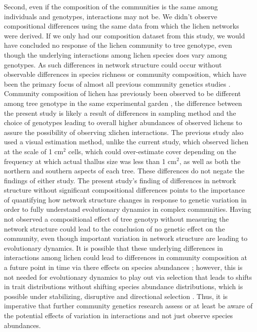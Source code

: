 \documentclass[fleqn,12pt]{olplainarticle}
\begin{document}
Second, even if the composition of the communities is the same among
individuals and genotypes, interactions may not be. We didn't observe
compositional differences using the same data from which the lichen
networks were derived. If we only had our composition dataset from
this study, we would have concluded no response of the lichen
community to tree genotype, even though the underlying interactions
among lichen species does vary among genotypes. As such differences in
network structure could occur without observable differences in
species richness or community composition, which have been the primary
focus of almost all previous community genetics studies
\cite{DesRoches2018TheVariation}. Community composition of lichen has
previously been observed to be different among tree genotype in the
same experimental garden \cite{Lamit2011, Lamit2015a}, the difference
between the present study is likely a result of differences in
sampling method and the choice of genotypes leading to overall higher
abundances of observed lichens to assure the possibility of observing
xlichen interactions. The previous study also used a visual estimation
method, unlike the current study, which observed lichen at the scale
of 1 cm$^2$ cells, which could over-estimate cover depending on the
frequency at which actual thallus size was less than 1 cm$^2$, as well
as both the northern and southern aspects of each tree. These
differences do not negate the findings of either study. The present
study's finding of differences in network structure without
significant compositional differences points to the importance of
quantifying how network structure changes in response to genetic
variation in order to fully understand evolutionary dynamics in
complex communities. Having not observed a compositional effect of
tree genotyp without measuring the network structure could lead to the
conclusion of no genetic effect on the community, even though
important variation in network structure are leading to evolutionary
dynamics. It is possible that these underlying differences in
interactions among lichen could lead to differences in community
composition at a future point in time via there effects on species
abundances \cite{Shuster2006COMMUNITYSTRUCTURE}; however, this is not
needed for evolutionary dynamics to play out via selection that leads
to shifts in trait distributions without shifting species abundance
distributions, which is possible under stabilizing, disruptive and
directional selection \cite{Conner2004ATextbook}. Thus, it is
imperative that further community genetics research assess or at least
be aware of the potential effects of variation in interactions and not
just observe species abundances.
\end{document}
